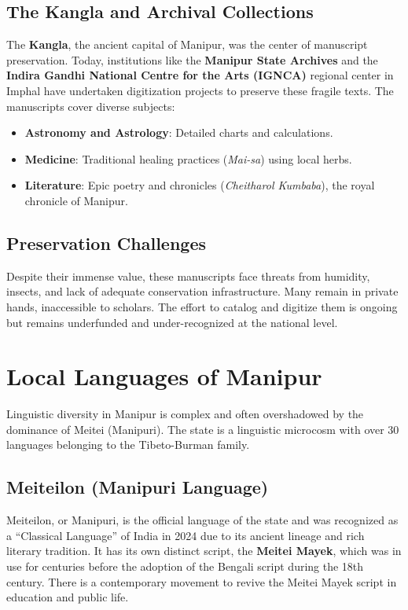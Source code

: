 \documentclass{article}
\begin{document}
\subsection{The Kangla and Archival Collections}
The \textbf{Kangla}, the ancient capital of Manipur, was the center of manuscript preservation. Today, institutions like the \textbf{Manipur State Archives} and the \textbf{Indira Gandhi National Centre for the Arts (IGNCA)} regional center in Imphal have undertaken digitization projects to preserve these fragile texts. The manuscripts cover diverse subjects:
\begin{itemize}
    \item \textbf{Astronomy and Astrology}: Detailed charts and calculations.
    \item \textbf{Medicine}: Traditional healing practices (\textit{Mai-sa}) using local herbs.
    \item \textbf{Literature}: Epic poetry and chronicles (\textit{Cheitharol Kumbaba}), the royal chronicle of Manipur.
\end{itemize}

\subsection{Preservation Challenges}
Despite their immense value, these manuscripts face threats from humidity, insects, and lack of adequate conservation infrastructure. Many remain in private hands, inaccessible to scholars. The effort to catalog and digitize them is ongoing but remains underfunded and under-recognized at the national level.

\begin{center}
\end{center}

\section{Local Languages of Manipur}
Linguistic diversity in Manipur is complex and often overshadowed by the dominance of Meitei (Manipuri). The state is a linguistic microcosm with over 30 languages belonging to the Tibeto-Burman family.

\subsection{Meiteilon (Manipuri Language)}
Meiteilon, or Manipuri, is the official language of the state and was recognized as a “Classical Language” of India in 2024 due to its ancient lineage and rich literary tradition. It has its own distinct script, the \textbf{Meitei Mayek}, which was in use for centuries before the adoption of the Bengali script during the 18th century. There is a contemporary movement to revive the Meitei Mayek script in education and public life.
\end{document}
